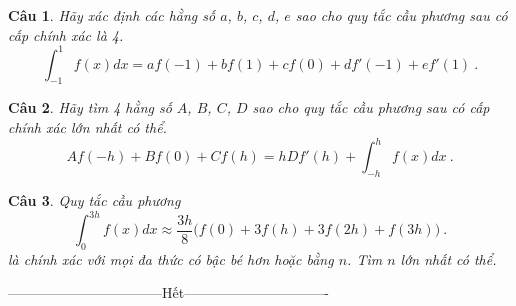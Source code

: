 \documentclass[11pt]{article}
\newtheorem{bt}{Câu}
\begin{document}
\begin{bt}
Hãy xác định các hằng số $a$, $b$, $c$, $d$, $e$ sao cho quy tắc cầu phương sau có cấp chính xác là 4.
%
\[  \int_{-1}^{1} f(x) dx = a f(-1) + bf (1) + cf(0) + d f'(-1) + e f'(1) \ .  \]
%
\end{bt}

\begin{bt}
Hãy tìm 4 hằng số $A$, $B$, $C$, $D$ sao cho quy tắc cầu phương sau có cấp chính xác lớn nhất có thể. 
%
\[  Af(-h) + B f(0) + C f(h) = hDf'(h) + \int_{-h}^{h} f(x) dx \ .
 \]%
\end{bt}

\begin{bt}
Quy tắc cầu phương
%
\[ \int_{0}^{3h} f(x) dx \approx \frac{3h}{8} \big( f (0) + 3 f (h) + 3 f (2h) + f (3h) \big) \ .
 \]%
là chính xác với mọi đa thức có bậc bé hơn hoặc bằng $n$. Tìm $n$ lớn nhất có thể.
\end{bt}

\centerline{———————————Hết——————————-}
\end{document}
